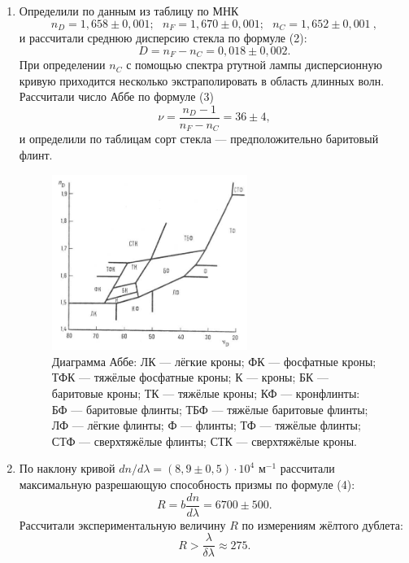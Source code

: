 \documentclass[a4paper, 12pt]{article}%
\begin{document}
\begin{enumerate}
	\item Определили по данным из таблицу по МНК
	\begin{equation*}
	n_D = 1{,}658\pm0{,}001;\ \ \ n_F = 1{,}670\pm0{,}001;\ \ \ n_C = 1{,}652\pm0{,}001\ ,
	\end{equation*}
	и рассчитали среднюю дисперсию стекла по формуле (2):
	\begin{equation*}
		D = n_F - n_C = 0{,}018\pm0{,}002.
	\end{equation*}
	При определении $n_C$ с помощью спектра ртутной лампы дисперсионную кривую приходится несколько экстраполировать в область длинных волн. Рассчитали число Аббе по формуле (3)
	\begin{equation*}
	\nu = \dfrac{n_D - 1}{n_F - n_C} = 36\pm 4,
	\end{equation*}
	 и определили по таблицам сорт стекла --- предположительно баритовый флинт.
	 	\begin{figure}[h]
	 	\begin{center}
	 		\includegraphics[width = 0.6\textwidth]{pic/443-4.jpg}
	 		\caption{\small{Диаграмма Аббе: ЛК — лёгкие кроны; ФК — фосфатные кроны; ТФК — тяжёлые фосфатные кроны; К — кроны; БК — баритовые кроны; ТК — тяжёлые кроны; КФ — кронфлинты: БФ — баритовые флинты; ТБФ — тяжёлые баритовые флинты; ЛФ — лёгкие флинты; Ф — флинты; ТФ — тяжёлые флинты; СТФ — сверхтяжёлые флинты; СТК — сверхтяжёлые кроны.}}
	 	\end{center}
	 \end{figure}
	\item По наклону кривой $dn/d\lambda = (8{,}9\pm0{,}5)\cdot10^{4}\text{ м}^{-1
	}$  рассчитали максимальную разрешающую способность призмы по формуле (4):
	\begin{equation*}
	R = b\dfrac{dn}{d\lambda} = 6700\pm500.
	\end{equation*}
	Рассчитали экспериментальную величину $R$ по измерениям жёлтого дублета:
	\begin{equation*}
	R > \dfrac{\lambda}{\delta\lambda} \approx 275.
	\end{equation*}
	

\end{enumerate}
\end{document}
